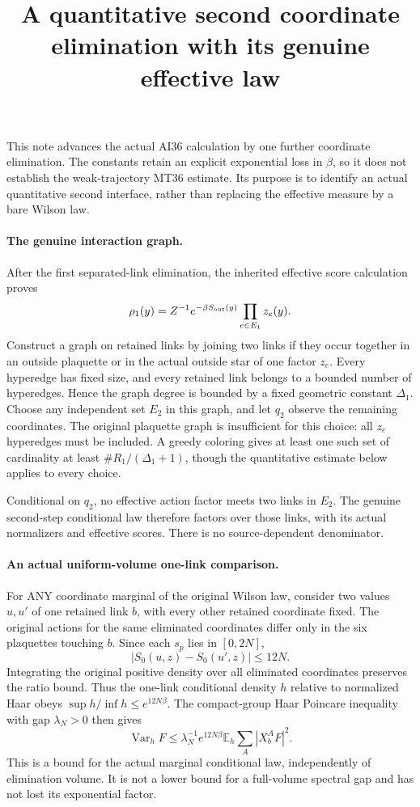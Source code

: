 \documentclass[11pt]{article}
\title{A quantitative second coordinate elimination with its genuine effective law}\author{}\date{}
\newcommand{\E}{\mathbb E}
\newcommand{\Var}{\operatorname{Var}}
\begin{document}
\maketitle
This note advances the actual AI36 calculation by one further coordinate elimination.
The constants retain an explicit exponential loss in $\beta$, so it does not establish the
weak-trajectory MT36 estimate. Its purpose is to identify an actual quantitative second
interface, rather than replacing the effective measure by a bare Wilson law.

\paragraph{The genuine interaction graph.}
After the first separated-link elimination, the inherited effective score calculation proves
\[
 \rho_1(y)=Z^{-1}e^{-\beta S_{\rm out}(y)}\prod_{e\in E_1}z_e(y).
\]
Construct a graph on retained links by joining two links if they occur together in an
outside plaquette or in the actual outside star of one factor $z_e$.
Every hyperedge has fixed size, and every retained link belongs to a bounded number
of hyperedges. Hence the graph degree is bounded by a fixed geometric constant $\Delta_1$.
Choose any independent set $E_2$ in this graph, and let $q_2$ observe the remaining
coordinates. The original plaquette graph is insufficient for this choice: all $z_e$
hyperedges must be included. A greedy coloring gives at least one such set of cardinality
at least $\#R_1/(\Delta_1+1)$, though the quantitative estimate below applies to every choice.

Conditional on $q_2$, no effective action factor meets two links in $E_2$.
The genuine second-step conditional law therefore factors over those links, with its
actual normalizers and effective scores. There is no source-dependent denominator.

\paragraph{An actual uniform-volume one-link comparison.}
For ANY coordinate marginal of the original Wilson law, consider two values $u,u'$ of
one retained link $b$, with every other retained coordinate fixed. The original actions
for the same eliminated coordinates differ only in the six plaquettes touching $b$.
Since each $s_p$ lies in $[0,2N]$,
\[
 |S_0(u,z)-S_0(u',z)|\le12N.
\]
Integrating the original positive density over all eliminated coordinates preserves the
ratio bound. Thus the one-link conditional density $h$ relative to normalized Haar obeys
$\sup h/\inf h\le e^{12N\beta}$.
The compact-group Haar Poincare inequality with gap $\lambda_N>0$ then gives
\[
 \Var_h F\le\lambda_N^{-1}e^{12N\beta}
              \E_h\sum_A|X_b^AF|^2.
\]
This is a bound for the actual marginal conditional law, independently of elimination
volume. It is not a lower bound for a full-volume spectral gap and has not lost its
exponential factor.
\end{document}
